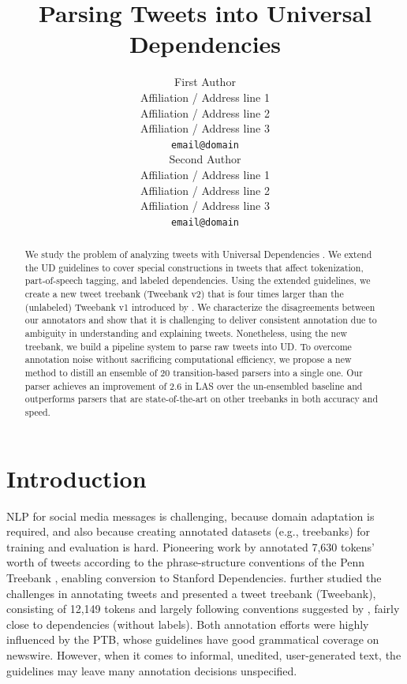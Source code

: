 \documentclass[11pt,a4paper]{article}
\title{Parsing Tweets into Universal Dependencies}
\author{First Author \\
  Affiliation / Address line 1 \\
  Affiliation / Address line 2 \\
  Affiliation / Address line 3 \\
  {\tt email@domain} \\\And
  Second Author \\
  Affiliation / Address line 1 \\
  Affiliation / Address line 2 \\
  Affiliation / Address line 3 \\
  {\tt email@domain} \\}
\date{}
\begin{document}
\maketitle
\begin{abstract}
We study the problem of analyzing tweets with
Universal Dependencies \citep[UD;][]{NIVRE16.348}. We extend the UD guidelines to cover
special constructions in tweets that affect tokenization,
part-of-speech tagging, and labeled dependencies. Using the extended guidelines, we create
a new tweet treebank ({\sc Tweebank v2}) that is four times larger than the (unlabeled) {\sc Tweebank
  v1} introduced by \citet{kong-EtAl:2014:EMNLP2014}. 
We characterize the disagreements between our annotators
and show that it is challenging to deliver
consistent annotation due to ambiguity in
understanding and explaining tweets. Nonetheless, using the new treebank,
we build a pipeline system to parse raw tweets into UD. To overcome 
annotation noise without sacrificing computational efficiency, we propose a new
method to distill an ensemble of 20 transition-based parsers into a single one. Our
parser achieves an improvement of 2.6 in LAS over the un-ensembled baseline 
and outperforms parsers that are state-of-the-art on other treebanks in both accuracy and speed.
\end{abstract}

\section{Introduction}
NLP for social media messages is challenging, because domain
adaptation is required, and also because creating annotated datasets
(e.g., treebanks)
for training and evaluation is hard. 
Pioneering work by \citet{AAAIW113912} 
annotated 7,630 tokens' worth of tweets according to the
phrase-structure conventions of the Penn Treebank
\citep[PTB;][]{Marcus93buildinga}, enabling conversion to Stanford Dependencies.
\citet{kong-EtAl:2014:EMNLP2014} further studied the challenges in
annotating tweets and presented a tweet treebank ({\sc Tweebank}),
consisting of 12,149 tokens and largely following conventions
suggested by \citet{schneider-EtAl:2013:LAW7-ID}, fairly close to 
\citet{Yamada03statisticaldependency} dependencies (without labels). 
Both annotation efforts were highly influenced by the PTB, whose guidelines
have good grammatical coverage on newswire. However, when it comes
to informal, unedited, user-generated text, the guidelines may leave
many annotation decisions unspecified.
\end{document}
